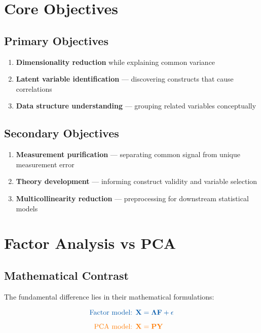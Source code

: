 \documentclass[a4paper]{tufte-book}
\newcommand{\tecbluetext}[1]{\textcolor{tecblue}{\textbf{#1}}}
\newcommand{\tecorangetext}[1]{\textcolor{tecorange}{\textbf{#1}}}
\begin{document}
\section{Core Objectives}

\subsection{Primary Objectives}
\begin{enumerate}[leftmargin=*,itemsep=0.8em]
  \item \tecbluetext{Dimensionality reduction} while explaining common variance
  \item \tecbluetext{Latent variable identification} — discovering constructs that cause correlations
  \item \tecbluetext{Data structure understanding} — grouping related variables conceptually
\end{enumerate}


\subsection{Secondary Objectives}
\begin{enumerate}[leftmargin=*,itemsep=0.8em]
  \item \tecorangetext{Measurement purification} — separating common signal from unique measurement error
  \item \tecorangetext{Theory development} — informing construct validity and variable selection
  \item \tecorangetext{Multicollinearity reduction} — preprocessing for downstream statistical models
\end{enumerate}

\section{Factor Analysis vs PCA}

\subsection{Mathematical Contrast}
The fundamental difference lies in their mathematical formulations:

\begin{align*}
  \textcolor{tecblue}{\text{Factor model: }} &\textcolor{tecblue}{\mathbf{X} = \mathbf{\Lambda F} + \mathbf{\epsilon}}\\[0.5em]
  \textcolor{tecorange}{\text{PCA model: }} &\textcolor{tecorange}{\mathbf{X} = \mathbf{PY}}
\end{align*}
\end{document}
